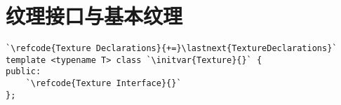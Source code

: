 \section{纹理接口与基本纹理}\label{sec:纹理接口与基本纹理}

\begin{lstlisting}
`\refcode{Texture Declarations}{+=}\lastnext{TextureDeclarations}`
template <typename T> class `\initvar{Texture}{}` {
public:
    `\refcode{Texture Interface}{}`
};
\end{lstlisting}